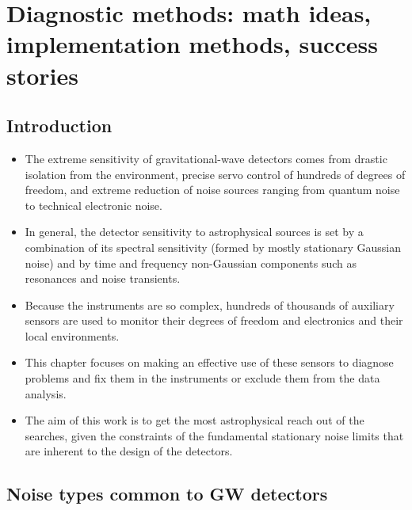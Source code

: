\chapter[Diagnostic methods]{Diagnostic methods: math ideas, implementation methods, success stories \label{ch15}}

\section{Introduction}\label{ch15:intro}

\begin{itemize}
\item The extreme sensitivity of gravitational-wave detectors comes from drastic isolation from the environment, precise servo control of hundreds of degrees of freedom, and extreme reduction of noise sources ranging from quantum noise to technical electronic noise. 
\item In general, the detector sensitivity to astrophysical sources is set by a combination of its spectral sensitivity (formed by mostly stationary Gaussian noise) and by time and frequency non-Gaussian components such as resonances and noise transients. 
\item Because the instruments are so complex, hundreds of thousands of auxiliary sensors are used to monitor their degrees of freedom and electronics and their local environments. 
\item This chapter focuses on making an effective use of these sensors to diagnose problems and fix them in the instruments or exclude them from the data analysis. 
\item The aim of this work is to get the most astrophysical reach out of the searches, given the constraints of the fundamental stationary noise limits that are inherent to the design of the detectors. 
\end{itemize}

\section{Noise types common to GW detectors}\label{ch15:noise}

